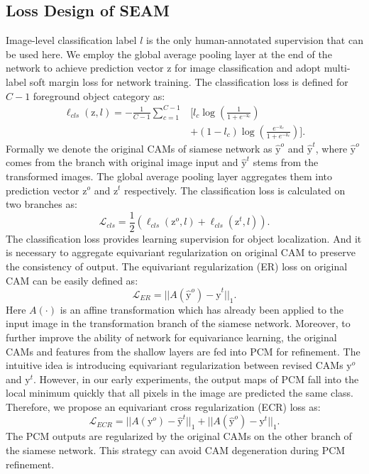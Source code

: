 \documentclass[10pt,twocolumn,letterpaper]{article}
\begin{document}
	\subsection{Loss Design of SEAM}
	\label{subsec:loss}
	Image-level classification label $l$ is the only human-annotated supervision that can be used here. We employ the global average pooling layer at the end of the network to achieve prediction vector $\mathrm{z}$ for image classification and adopt multi-label soft margin loss for network training. The classification loss is defined for $C-1$ foreground object category as:
	\begin{equation}
	\begin{aligned}
	\ell_{cls}(\mathrm{z},l)=-\frac{1}{C-1}\sum_{c=1}^{C-1} & [l_c\log(\frac{1}{1+e^{-\mathrm{z}_c}})\\
	& +(1-l_c)\log(\frac{e^{-\mathrm{z}_c}}{1+e^{-\mathrm{z}_c}})].
	\end{aligned}
	\end{equation}
	Formally we denote the original CAMs of siamese network as $\hat{\mathrm{y}}^o$ and $\hat{\mathrm{y}}^t$, where $\hat{\mathrm{y}}^o$ comes from the branch with original image input and $\hat{\mathrm{y}}^t$ stems from the transformed images. The global average pooling layer aggregates them into prediction vector $\mathrm{z}^o$ and $\mathrm{z}^t$ respectively. The classification loss is calculated on two branches as:
	\begin{equation}
	\mathcal{L}_{cls}=\frac{1}{2}(\ell_{cls}(\mathrm{z}^o,l)+\ell_{cls} (\mathrm{z}^t,l)).
	\end{equation}	
	The classification loss provides learning supervision for object localization. And it is necessary to aggregate equivariant regularization on original CAM to preserve the consistency of output. The equivariant regularization (ER) loss on original CAM can be easily defined as:
	\begin{equation}
	\mathcal{L}_{ER} = ||A(\hat{\mathrm{y}}^o)-\hat{\mathrm{y}}^t||_1.
	\end{equation}
	Here $A(\cdot)$ is an affine transformation which has already been applied to the input image in the transformation branch of the siamese network. Moreover, to further improve the ability of network for equivariance learning, the original CAMs and features from the shallow layers are fed into PCM for refinement. The intuitive idea is introducing equivariant regularization between revised CAMs $\mathrm{y}^o$ and $\mathrm{y}^t$. However, in our early experiments, the output maps of PCM fall into the local minimum quickly that all pixels in the image are predicted the same class. Therefore, we propose an equivariant cross regularization (ECR) loss as:
	\begin{equation}
	\mathcal{L}_{ECR} = ||A(\mathrm{y}^o)-\hat{\mathrm{y}}^t||_1+||A(\hat{\mathrm{y}}^o)-\mathrm{y}^t||_1.
	\label{eq:ecrloss}
	\end{equation} 
	The PCM outputs are regularized by the original CAMs on the other branch of the siamese network. This strategy can avoid CAM degeneration during PCM refinement.
	
\end{document}
